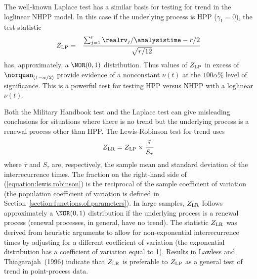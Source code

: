 The well-known Laplace test has a similar basis for testing for
trend in the loglinear NHPP model. In this case if the underlying
process is HPP ($\gamma_{1}=0$), the test statistic
\begin{eqnarray*}
Z_{\rm LP}&=&\frac{
    \sum_{j=1}^{r} {\realrv_{j}}/
			{\analysistime}
	-{r}/{2} 
    }
     {
    \sqrt{r/12}
     }  
\end{eqnarray*}
has, approximately, a $\NOR(0,1)$ distribution. Thus values of
$Z_{\rm LP}$ in excess of $\norquan_{(1-\alpha/2)}$ provide evidence
of a nonconstant $\nu(t)$ at the $100 \alpha \%$ level of
significance. This is a powerful test for testing HPP versus NHPP
with a loglinear $\nu(t)$.

Both the Military Handbook test and the Laplace test can give
misleading conclusions for situations where there is no trend but the
underlying process is a renewal process other than HPP. The
Lewis-Robinson test for trend uses
\begin{equation}
\label{equation:lewis.robinson}
Z_{\rm LR} = Z_{\rm LP} \times \frac{\bar{\tau}}{S_{\tau}}
\end{equation}
where $\bar{\tau}$ and $S_{\tau}$ are, respectively, the sample mean
and standard deviation of the interrecurrence times.  The fraction
on the right-hand side of (\ref{equation:lewis.robinson}) is the
reciprocal of the sample coefficient of variation (the population
coefficient of variation is defined in
Section~\ref{section:functions.of.parameters}).  In large samples,
$Z_{\rm LR}$ follows approximately a $\NOR(0,1)$ distribution if the
underlying process is a renewal process (renewal processes, in
general, have no trend).  The statistic $Z_{\rm LR}$ was derived
from heuristic arguments to allow for non-exponential
interrecurrence times by adjusting for a different coefficient of
variation (the exponential distribution has a coefficient of
variation equal to 1).  Results in Lawless and Thiagarajah~(1996)
indicate that $Z_{\rm LR}$ is preferable to $Z_{\rm LP}$ as a
general test of trend in point-process data.

